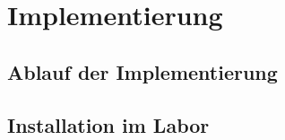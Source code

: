 \chapter{Implementierung} \label{chap:implementierung}


\section{Ablauf der Implementierung} \label{sec:ablauf_der_implementierung}


\section{Installation im Labor} \label{sec:installation_im_labor}